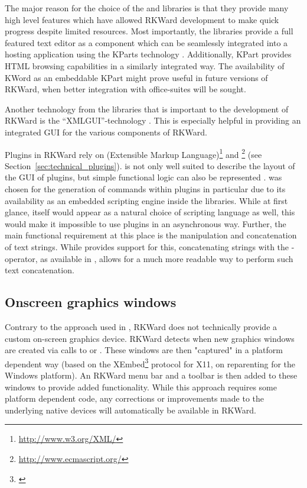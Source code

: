 The major reason for the choice of the  and  libraries is that they provide
many high level features which have allowed RKWard development to make quick
progress despite limited resources. Most importantly, the  libraries provide a
full featured text editor \citep{CullmannND} as a component which can be
seamlessly integrated into a hosting application using the KParts technology
\citep{Faure2000}. Additionally, KPart provides HTML browsing capabilities in a
similarly integrated way. The availability of KWord \citep{KWord} as an
embeddable KPart might prove useful in future versions of RKWard, when better
integration with office-suites will be sought.

Another technology from the  libraries that is important to the development
of RKWard is the ``XMLGUI''-technology
\citep{Faure2000}. This is especially helpful in providing an integrated GUI for
the various components of RKWard.

Plugins in RKWard rely on  (Extensible Markup Language)\footnote{\url{http://www.w3.org/XML/}}
and \footnote{\url{http://www.ecmascript.org/}} (see Section~\ref{sec:technical_plugins}).  is not
only well suited to describe the layout of the GUI of plugins, but simple
functional logic can also be represented \citep{Visne2009}.  was
chosen for the generation of  commands within plugins in particular due to its
availability as an embedded scripting engine inside the  libraries. While at
first glance,  itself would appear as a natural choice of scripting language as
well, this would make it impossible to use plugins in an asynchronous way.
Further, the main functional requirement at this place is the manipulation and
concatenation of text strings. While  provides support for this, concatenating
strings with the \code{+}-operator, as available in , allows for a much
more readable way to perform such text concatenation.

\subsection{Onscreen graphics windows}
\label{sec:technical_graphics}
Contrary to the approach used in  \citep{HelbigTheus2005}, RKWard does
not technically provide a custom on-screen graphics device. RKWard detects when
new graphics windows are created via calls to  or . These windows
are then "captured" in a platform dependent way (based on the XEmbed\footnote{\citep{Ettrich2002}} protocol
for X11, on reparenting for the Windows platform). An RKWard menu bar and a
toolbar is then added to these windows to provide added functionality. While
this approach requires some platform dependent code, any corrections or
improvements made to the underlying  native devices will automatically be
available in RKWard.

